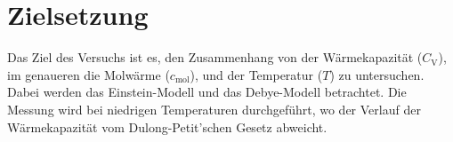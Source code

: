 \section{Zielsetzung}
Das Ziel des Versuchs ist es, den Zusammenhang von der Wärmekapazität ($C_\text{V}$), im genaueren die Molwärme ($c_\text{mol}$), und der Temperatur ($T$) zu untersuchen.
Dabei werden das Einstein-Modell und das Debye-Modell betrachtet.
Die Messung wird bei niedrigen Temperaturen durchgeführt, wo der Verlauf der Wärmekapazität vom Dulong-Petit'schen Gesetz abweicht.
